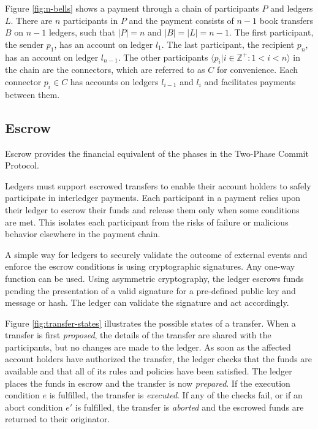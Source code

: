 \documentclass[letterpaper,twocolumn,10pt]{article}
\begin{document}
Figure \ref{fig:n-bells} shows a payment through a chain of participants $P$ and ledgers $L$. There are $n$ participants in $P$ and the payment consists of $n-1$ book transfers $B$ on $n-1$ ledgers, such that $ \left\vert{P}\right\vert = n $ and $\left\vert{B}\right\vert = \left\vert{L}\right\vert = n-1 $. The first participant, the sender $p_1$, has an account on ledger $l_1$. The last participant, the recipient $p_n$, has an account on ledger $l_{n-1}$. The other participants $ \langle p_i | i \in \mathbb{Z}^+ : 1 < i < n \rangle $ in the chain are the connectors, which are referred to as $C$ for convenience. Each connector $p_i \in C$ has accounts on ledgers $l_{i-1}$ and $l_i$ and facilitates payments between them.

\subsection{Escrow}

Escrow provides the financial equivalent of the phases in the Two-Phase Commit Protocol. \cite{Gray:1978:NDB:647433.723863}

Ledgers must support escrowed transfers to enable their account holders to safely participate in interledger payments. Each participant in a payment relies upon their ledger to escrow their funds and release them only when some conditions are met. This isolates each participant from the risks of failure or malicious behavior elsewhere in the payment chain.

A simple way for ledgers to securely validate the outcome of external events and enforce the escrow conditions is using cryptographic signatures. Any one-way function can be used.\cite{rompel1990one} Using asymmetric cryptography, the ledger escrows funds pending the presentation of a valid signature for a pre-defined public key and message or hash. The ledger can validate the signature and act accordingly.

Figure \ref{fig:transfer-states} illustrates the possible states of a transfer. When a transfer is first \textit{proposed}, the details of the transfer are shared with the participants, but no changes are made to the ledger. As soon as the affected account holders have authorized the transfer, the ledger checks that the funds are available and that all of its rules and policies have been satisfied. The ledger places the funds in escrow and the transfer is now \textit{prepared}. If the execution condition $e$ is fulfilled, the transfer is \textit{executed}. If any of the checks fail, or if an abort condition $e'$ is fulfilled, the transfer is \textit{aborted} and the escrowed funds are returned to their originator.
\end{document}
